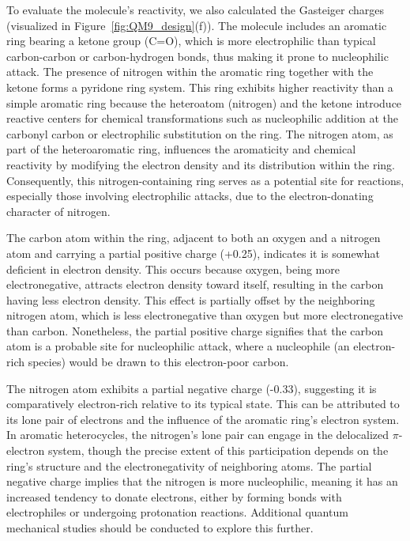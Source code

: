 To evaluate the molecule’s reactivity, we also calculated the Gasteiger charges~\cite{Gasteiger1980IterativeCharges} (visualized in Figure~\ref{fig:QM9_design}(f)). The molecule includes an aromatic ring bearing a ketone group (C=O), which is more electrophilic than typical carbon-carbon or carbon-hydrogen bonds, thus making it prone to nucleophilic attack. The presence of nitrogen within the aromatic ring together with the ketone forms a pyridone ring system. This ring exhibits higher reactivity than a simple aromatic ring because the heteroatom (nitrogen) and the ketone introduce reactive centers for chemical transformations such as nucleophilic addition at the carbonyl carbon or electrophilic substitution on the ring. The nitrogen atom, as part of the heteroaromatic ring, influences the aromaticity and chemical reactivity by modifying the electron density and its distribution within the ring. Consequently, this nitrogen-containing ring serves as a potential site for reactions, especially those involving electrophilic attacks, due to the electron-donating character of nitrogen.

The carbon atom within the ring, adjacent to both an oxygen and a nitrogen atom and carrying a partial positive charge (+0.25), indicates it is somewhat deficient in electron density. This occurs because oxygen, being more electronegative, attracts electron density toward itself, resulting in the carbon having less electron density. This effect is partially offset by the neighboring nitrogen atom, which is less electronegative than oxygen but more electronegative than carbon. Nonetheless, the partial positive charge signifies that the carbon atom is a probable site for nucleophilic attack, where a nucleophile (an electron-rich species) would be drawn to this electron-poor carbon.

The nitrogen atom exhibits a partial negative charge (-0.33), suggesting it is comparatively electron-rich relative to its typical state. This can be attributed to its lone pair of electrons and the influence of the aromatic ring’s electron system. In aromatic heterocycles, the nitrogen’s lone pair can engage in the delocalized $\pi$-electron system, though the precise extent of this participation depends on the ring’s structure and the electronegativity of neighboring atoms. The partial negative charge implies that the nitrogen is more nucleophilic, meaning it has an increased tendency to donate electrons, either by forming bonds with electrophiles or undergoing protonation reactions. Additional quantum mechanical studies should be conducted to explore this further.

